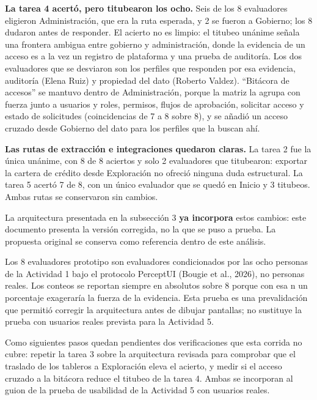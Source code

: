 \textbf{La tarea 4 acertó, pero titubearon los ocho.} Seis de los 8 evaluadores eligieron Administración, que era la ruta esperada, y 2 se fueron a Gobierno; los 8 dudaron antes de responder. El acierto no es limpio: el titubeo unánime señala una frontera ambigua entre gobierno y administración, donde la evidencia de un acceso es a la vez un registro de plataforma y una prueba de auditoría. Los dos evaluadores que se desviaron son los perfiles que responden por esa evidencia, auditoría (Elena Ruiz) y propiedad del dato (Roberto Valdez). ``Bitácora de accesos'' se mantuvo dentro de Administración, porque la matriz la agrupa con fuerza junto a usuarios y roles, permisos, flujos de aprobación, solicitar acceso y estado de solicitudes (coincidencias de 7 a 8 sobre 8), y se añadió un acceso cruzado desde Gobierno del dato para los perfiles que la buscan ahí.

\textbf{Las rutas de extracción e integraciones quedaron claras.} La tarea 2 fue la única unánime, con 8 de 8 aciertos y solo 2 evaluadores que titubearon: exportar la cartera de crédito desde Exploración no ofreció ninguna duda estructural. La tarea 5 acertó 7 de 8, con un único evaluador que se quedó en Inicio y 3 titubeos. Ambas rutas se conservaron sin cambios.

La arquitectura presentada en la subsección 3 \textbf{ya incorpora} estos cambios: este documento presenta la versión corregida, no la que se puso a prueba. La propuesta original se conserva como referencia dentro de este análisis.

\begin{uxnota}
Los 8 evaluadores prototipo son evaluadores condicionados por las ocho personas de la Actividad 1 bajo el protocolo PerceptUI (Bougie et al., 2026), no personas reales. Los conteos se reportan siempre en absolutos sobre 8 porque con esa n un porcentaje exageraría la fuerza de la evidencia. Esta prueba es una prevalidación que permitió corregir la arquitectura antes de dibujar pantallas; no sustituye la prueba con usuarios reales prevista para la Actividad 5.
\end{uxnota}

Como siguientes pasos quedan pendientes dos verificaciones que esta corrida no cubre: repetir la tarea 3 sobre la arquitectura revisada para comprobar que el traslado de los tableros a Exploración eleva el acierto, y medir si el acceso cruzado a la bitácora reduce el titubeo de la tarea 4. Ambas se incorporan al guion de la prueba de usabilidad de la Actividad 5 con usuarios reales.

